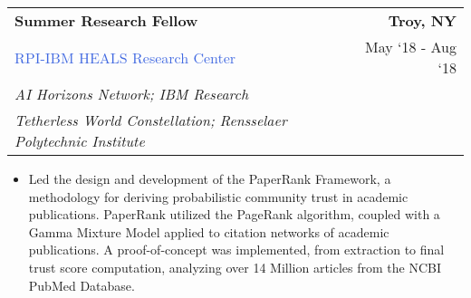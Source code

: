 \documentclass[10pt]{article}
\newcommand{\highlightcolor}{RoyalBlue}
\newcommand{\tabularxwidth}{\textwidth}
\begin{document}
    \begin{minipage}{\tabularxwidth}

        \begin{tabularx}{\tabularxwidth}{X r}
            \textbf{Summer Research Fellow} & \textbf{Troy, 
        NY} \\
            
    
    
    
    

    
        \textcolor{\highlightcolor}{RPI-IBM HEALS Research Center} & 
        
    May ‘18 - 
    Aug ‘18 \\
        
            
                \textit{AI Horizons Network; IBM Research} & \\
            
                \textit{Tetherless World Constellation; Rensselaer Polytechnic Institute} & \\
            
        
    
            
        \end{tabularx}

        \begin{itemize}[noitemsep, topsep=3pt, parsep=0pt, partopsep=0pt]
            
                \item 
    Led the design and development of the PaperRank Framework, a methodology for deriving probabilistic community trust in academic publications. PaperRank utilized the PageRank algorithm, coupled with a Gamma Mixture Model applied to citation networks of academic publications. A proof-of-concept was implemented, from extraction to final trust score computation, analyzing over 14 Million articles from the NCBI PubMed Database.
            

\end{itemize}
\end{minipage}
\end{document}
